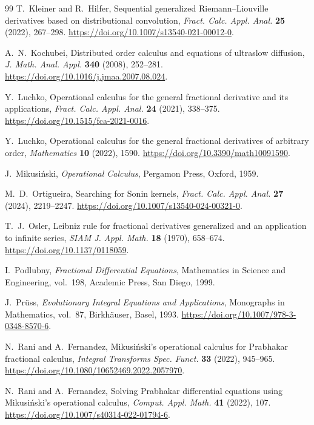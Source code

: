 \documentclass[11pt]{article}
\numberwithin{equation}{section}
\theoremstyle{definition}
\theoremstyle{remark}
\begin{document}
\begin{thebibliography}{99}
T.~Kleiner and R.~Hilfer,
Sequential generalized Riemann--Liouville derivatives based on distributional convolution,
\emph{Fract. Calc. Appl. Anal.} \textbf{25} (2022), 267--298.
\url{https://doi.org/10.1007/s13540-021-00012-0}.

A.~N.~Kochubei,
Distributed order calculus and equations of ultraslow diffusion,
\emph{J. Math. Anal. Appl.} \textbf{340} (2008), 252--281.
\url{https://doi.org/10.1016/j.jmaa.2007.08.024}.

Y.~Luchko,
Operational calculus for the general fractional derivative and its applications,
\emph{Fract. Calc. Appl. Anal.} \textbf{24} (2021), 338--375.
\url{https://doi.org/10.1515/fca-2021-0016}.

Y.~Luchko,
Operational calculus for the general fractional derivatives of arbitrary order,
\emph{Mathematics} \textbf{10} (2022), 1590.
\url{https://doi.org/10.3390/math10091590}.

J.~Mikusi\'nski,
\emph{Operational Calculus},
Pergamon Press, Oxford, 1959.

M.~D.~Ortigueira,
Searching for Sonin kernels,
\emph{Fract. Calc. Appl. Anal.} \textbf{27} (2024), 2219--2247.
\url{https://doi.org/10.1007/s13540-024-00321-0}.

T.~J.~Osler,
Leibniz rule for fractional derivatives generalized and an application to infinite series,
\emph{SIAM J. Appl. Math.} \textbf{18} (1970), 658--674.
\url{https://doi.org/10.1137/0118059}.

I.~Podlubny,
\emph{Fractional Differential Equations},
Mathematics in Science and Engineering, vol.~198, Academic Press, San Diego, 1999.

J.~Pr\"uss,
\emph{Evolutionary Integral Equations and Applications},
Monographs in Mathematics, vol.~87, Birkh\"auser, Basel, 1993.
\url{https://doi.org/10.1007/978-3-0348-8570-6}.

N.~Rani and A.~Fernandez,
Mikusi\'nski's operational calculus for Prabhakar fractional calculus,
\emph{Integral Transforms Spec. Funct.} \textbf{33} (2022), 945--965.
\url{https://doi.org/10.1080/10652469.2022.2057970}.

N.~Rani and A.~Fernandez,
Solving Prabhakar differential equations using Mikusi\'nski's operational calculus,
\emph{Comput. Appl. Math.} \textbf{41} (2022), 107.
\url{https://doi.org/10.1007/s40314-022-01794-6}.


\end{thebibliography}
\end{document}
